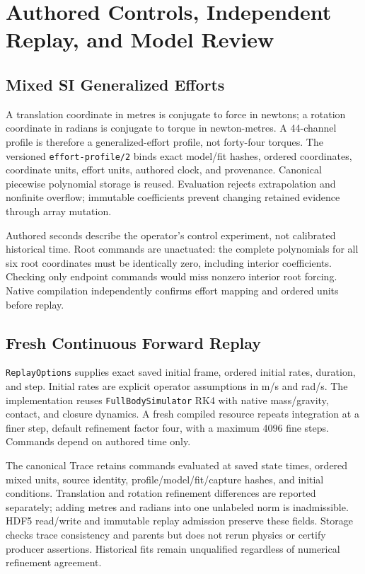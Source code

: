 \documentclass[11pt,letterpaper]{article}
\newcommand{\code}[1]{\nolinkurl{#1}}
\newcommand{\reportsection}[1]{\section{#1}}
\begin{document}
\reportsection{Authored Controls, Independent Replay, and Model Review}
\subsection{Mixed SI Generalized Efforts}
A translation coordinate in metres is conjugate to force in newtons; a rotation
coordinate in radians is conjugate to torque in newton-metres. A 44-channel
profile is therefore a generalized-effort profile, not forty-four torques.
The versioned \code{effort-profile/2} binds exact model/fit hashes, ordered
coordinates, coordinate units, effort units, authored clock, and provenance.
Canonical piecewise polynomial storage is reused. Evaluation rejects
extrapolation and nonfinite overflow; immutable coefficients prevent changing
retained evidence through array mutation.

Authored seconds describe the operator's control experiment, not calibrated
historical time. Root commands are unactuated: the complete polynomials for
all six root coordinates must be identically zero, including interior
coefficients. Checking only endpoint commands would miss nonzero interior
root forcing. Native compilation independently confirms effort mapping and
ordered units before replay.

\subsection{Fresh Continuous Forward Replay}
\code{ReplayOptions} supplies exact saved initial frame, ordered initial rates,
duration, and step. Initial rates are explicit operator assumptions in m/s and
rad/s. The implementation reuses \code{FullBodySimulator} RK4 with native
mass/gravity, contact, and closure dynamics. A fresh compiled resource repeats
integration at a finer step, default refinement factor four, with a maximum
4096 fine steps. Commands depend on authored time only.

The canonical Trace retains commands evaluated at saved state times, ordered
mixed units, source identity, profile/model/fit/capture hashes, and initial
conditions. Translation and rotation refinement differences are reported
separately; adding metres and radians into one unlabeled norm is inadmissible.
HDF5 read/write and immutable replay admission preserve these fields. Storage
checks trace consistency and parents but does not rerun physics or certify
producer assertions. Historical fits remain unqualified regardless of
numerical refinement agreement.
\end{document}
